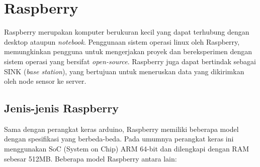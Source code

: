 \section{Raspberry}
Raspberry merupakan komputer berukuran kecil yang dapat terhubung dengan desktop ataupun \textit{notebook}. Penggunaan sistem operasi linux oleh Raspberry, memungkinkan pengguna untuk mengerjakan proyek dan bereksperimen dengan sistem operasi yang bersifat \textit{open-source}. Raspberry juga dapat bertindak sebagai SINK (\textit{base station}), yang bertujuan untuk meneruskan data yang dikirimkan oleh node sensor ke server\cite{ahmad:17:raspberry}.

\subsection{Jenis-jenis Raspberry} \label{Jenis Raspberry}
Sama dengan perangkat keras arduino, Raspberry memiliki beberapa model dengan spesifikasi yang berbeda-beda. Pada umumnya perangkat keras ini menggunakan SoC (System on Chip) ARM 64-bit dan dilengkapi dengan RAM sebesar 512MB. Beberapa model Raspberry antara lain: 
